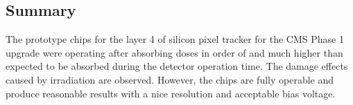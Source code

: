 \subsection{Summary}

The prototype chips for the layer 4 of silicon pixel tracker for the CMS Phase 1 upgrade were operating after absorbing doses in order of and 
much higher than expected to be absorbed during the detector operation time. The damage effects caused by irradiation are observed. However,
the chips are fully operable and produce reasonable results with a nice resolution and acceptable bias voltage. 